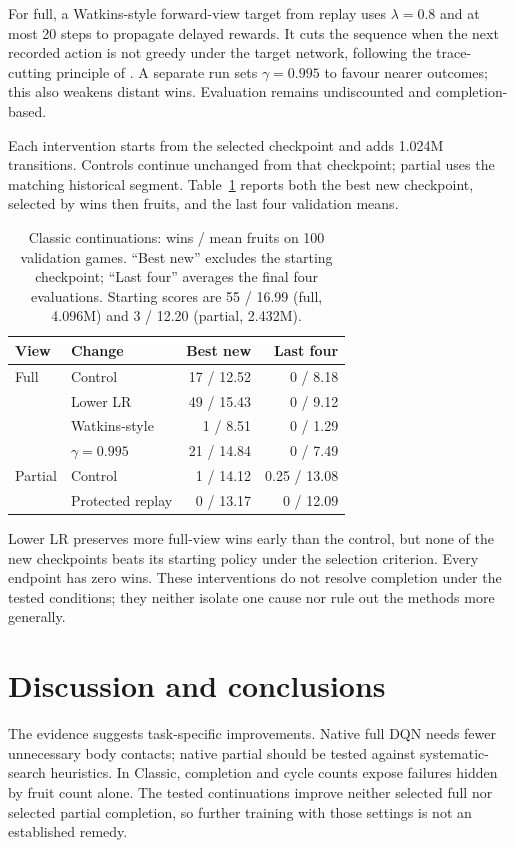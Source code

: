 \documentclass{article}
\begin{document}
For full, a Watkins-style forward-view target from replay uses $\lambda=0.8$ and at most 20 steps to propagate delayed rewards. It cuts the sequence when the next recorded action is not greedy under the target network, following the trace-cutting principle of \citet[Sec.~12.10, Fig.~12.12]{sutton2018}. A separate run sets $\gamma=0.995$ to favour nearer outcomes; this also weakens distant wins. Evaluation remains undiscounted and completion-based.

Each intervention starts from the selected checkpoint and adds 1.024M transitions. Controls continue unchanged from that checkpoint; partial uses the matching historical segment. Table~\ref{tab:interventions} reports both the best new checkpoint, selected by wins then fruits, and the last four validation means.

\begin{table}[ht]
\caption{Classic continuations: wins / mean fruits on 100 validation games. ``Best new'' excludes the starting checkpoint; ``Last four'' averages the final four evaluations. Starting scores are 55 / 16.99 (full, 4.096M) and 3 / 12.20 (partial, 2.432M).}
\label{tab:interventions}
\centering
\begin{small}
\begin{tabular}{llrr}
\toprule
View & Change & Best new & Last four \\
\midrule
Full & Control & 17 / 12.52 & 0 / 8.18 \\
 & Lower LR & 49 / 15.43 & 0 / 9.12 \\
 & Watkins-style & 1 / 8.51 & 0 / 1.29 \\
 & $\gamma=0.995$ & 21 / 14.84 & 0 / 7.49 \\
Partial & Control & 1 / 14.12 & 0.25 / 13.08 \\
 & Protected replay & 0 / 13.17 & 0 / 12.09 \\
\bottomrule
\end{tabular}
\end{small}
\end{table}

Lower LR preserves more full-view wins early than the control, but none of the new checkpoints beats its starting policy under the selection criterion. Every endpoint has zero wins. These interventions do not resolve completion under the tested conditions; they neither isolate one cause nor rule out the methods more generally.

\section{Discussion and conclusions}
The evidence suggests task-specific improvements. Native full DQN needs fewer unnecessary body contacts; native partial should be tested against systematic-search heuristics. In Classic, completion and cycle counts expose failures hidden by fruit count alone. The tested continuations improve neither selected full nor selected partial completion, so further training with those settings is not an established remedy.
\end{document}
